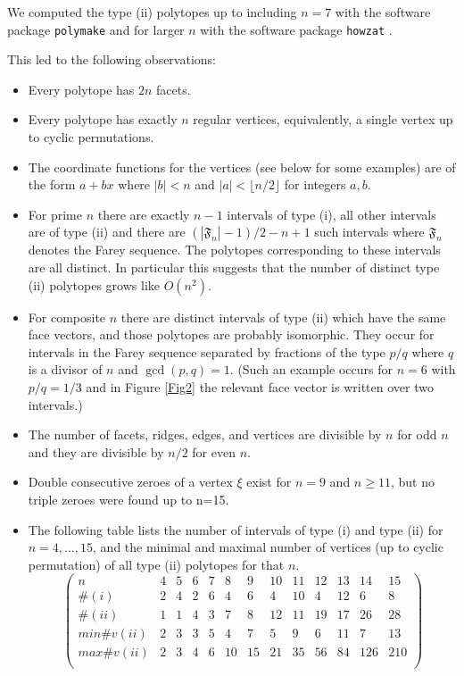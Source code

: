 \documentclass[a4paper,11pt,reqno]{amsart}
\theoremstyle{definition}
\numberwithin{equation}{section}
\def\fF{{\mathfrak F}}                      %
\begin{document}
We computed the type (ii) polytopes up to including $n=7$ with the software package {\tt  polymake}
 \cite{poly}
and for larger $n$ with the software package {\tt howzat} \cite{howzat}.

This led to the following observations:
\begin{itemize}
\item Every polytope has $2n$ facets.
\item Every polytope has exactly $n$ regular vertices, equivalently, a single vertex up to cyclic permutations.
\item The coordinate functions for the vertices (see below for some examples) are of the form $a + b x$
where $|b| < n$ and $|a| < \lfloor n/2 \rfloor$ for integers $a,b$.
\item For prime $n$ there are exactly $n-1$ intervals of type (i), all other intervals are of type (ii) and there
are $(|\fF_n|-1)/2 - n + 1$ such intervals where $\fF_n$ denotes the Farey sequence.
The polytopes corresponding to these intervals are all distinct. In particular this suggests that
the number of distinct type (ii) polytopes grows like $O(n^2)$.
\item For composite $n$ there are distinct intervals of type (ii) which have the same face vectors,  and those polytopes are probably isomorphic.
They occur for intervals in the Farey sequence  separated by fractions of the type
 $p/q$ where $q$ is a divisor of $n$ and $\gcd(p, q) = 1$.
(Such an example occurs for $n=6$ with $p/q=1/3$ and in Figure \ref{Fig2}  the relevant  face vector is written over two intervals.)
\item The number of facets, ridges, edges, and vertices are divisible by $n$ for odd $n$ and they are divisible by $n/2$ for even $n$.
 \item Double consecutive zeroes of a vertex $\xi$ exist for $n=9$ and $n\geq 11$, but no triple zeroes were found up to n=15.
\item The following table lists the number of intervals of type (i) and type (ii) for $n = 4, \dots, 15$,
and the minimal and maximal number of vertices (up to cyclic permutation) of all type (ii) polytopes for that $n$.
\[
\left(
\begin{array}{c|cccccccccccc}
n &  4 & 5 & 6 & 7 & 8 & 9 & 10 & 11 & 12 & 13 & 14 & 15 \\ \hline
\#(i) & 2 & 4 & 2 & 6 & 4 & 6 & 4 & 10 & 4 & 12 & 6 & 8 \\
\#(ii) & 1 & 1 & 4 & 3 & 7 & 8 & 12 & 11 & 19 & 17 & 26 & 28 \\
min\#v(ii) & 2 & 3 & 3 & 5 & 4 & 7 & 5 & 9 & 6 & 11 & 7 & 13 \\
max\#v(ii) & 2 & 3 & 4 & 6 & 10 & 15 & 21 & 35 & 56 & 84 & 126 & 210 \\
\end{array}
\right)
\]
\end{itemize}
\end{document}
